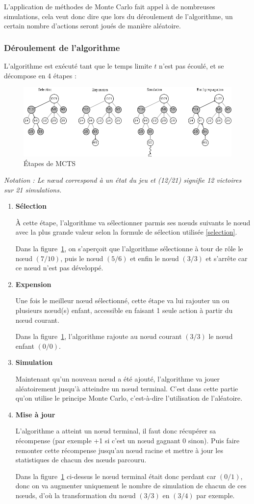 \documentclass[pdftex,french, english]{article}	%
\begin{document}
	L'application de méthodes de Monte Carlo fait appel à de nombreuses simulations, cela veut donc dire que lors du déroulement de l'algorithme, un certain nombre d'actions seront joués de manière aléatoire.
	\subsubsection{Déroulement de l'algorithme}
	L'algorithme est exécuté tant que le temps limite $t$ n'est pas écoulé, et se décompose en 4 étapes :
	\begin{figure}[h]
		\centering
		\includegraphics[width=\textwidth]{etapes.png}
		\caption{ Étapes de MCTS}
		 \label{fig:mcts}
	\end{figure}

\textit{Notation : Le nœud correspond à un état du jeu et (12/21) signifie 12 victoires sur 21 simulations.} 
	\begin{enumerate}
		\item \textbf{Sélection}

		À cette étape, l'algorithme va sélectionner parmis ses nœuds suivants le nœud avec la plus grande valeur selon la formule de sélection utilisée \ref{selection}. 

		Dans la figure~\ref{fig:mcts}, on s'aperçoit que l'algorithme sélectionne à tour de rôle le nœud $(7/10)$, puis le nœud $(5/6)$ et enfin le nœud $(3/3)$ et s'arrête car ce nœud n'est pas développé.
		\item \textbf{Expension}

		Une fois le meilleur nœud sélectionné, cette étape va lui rajouter un ou plusieurs nœud(s) enfant, accessible en faisant 1 seule action à partir du nœud courant. 

		Dans la figure~\ref{fig:mcts}, l'algorithme rajoute au nœud courant $(3/3)$ le nœud enfant $(0/0)$.
		\item \textbf{Simulation}

		Maintenant qu'un nouveau nœud a été ajouté, l'algorithme va jouer aléatoirement jusqu'à atteindre un nœud terminal.
		C'est dans cette partie qu'on utilise le principe Monte Carlo, c'est-à-dire l'utilisation de l'aléatoire.
		\item \textbf{Mise à jour} 

		L'algorithme a atteint un nœud terminal, il faut donc récupérer sa récompense (par exemple +1 si c'est un nœud gagnant 0 sinon). Puis faire remonter cette récompense jusqu'au nœud racine et mettre à jour les statistiques de chacun des nœuds parcouru. 

		Dans la figure~\ref{fig:mcts} ci-dessus le nœud terminal était donc perdant car $(0/1)$, donc on va augmenter uniquement le nombre de simulation de chacun de ces nœuds, d'où la transformation du nœud $(3/3)$ en $(3/4)$ par exemple.
	\end{enumerate}
\end{document}
